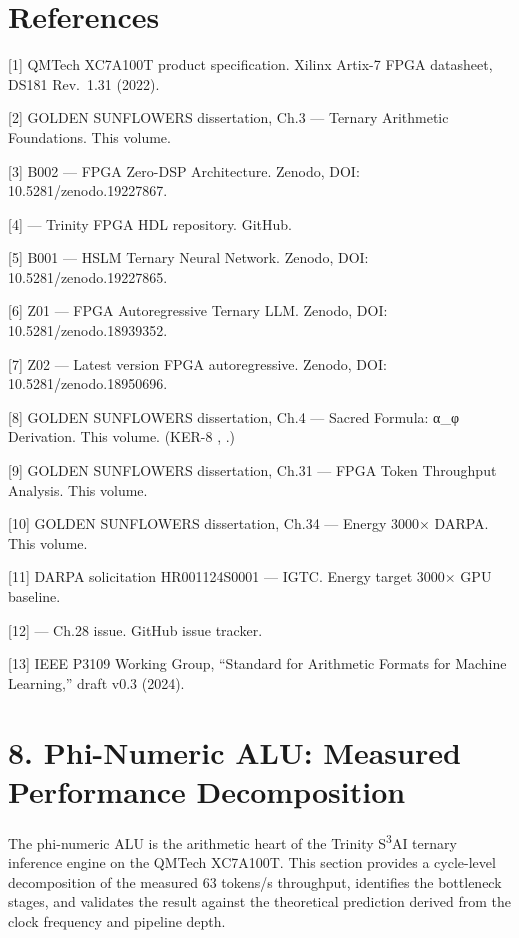 \section{References}\label{fa_28:references}

[1] QMTech XC7A100T product specification.
Xilinx Artix-7 FPGA datasheet, DS181 Rev.~1.31
(2022).

[2] GOLDEN SUNFLOWERS dissertation, Ch.3 ---
Ternary Arithmetic Foundations. This volume.

[3] B002 --- FPGA Zero-DSP Architecture.
Zenodo, DOI: 10.5281/zenodo.19227867.

[4]  --- Trinity
FPGA HDL repository. GitHub.

[5] B001 --- HSLM Ternary Neural Network.
Zenodo, DOI: 10.5281/zenodo.19227865.

[6] Z01 --- FPGA Autoregressive Ternary LLM.
Zenodo, DOI: 10.5281/zenodo.18939352.

[7] Z02 --- Latest version FPGA
autoregressive. Zenodo, DOI:
10.5281/zenodo.18950696.

[8] GOLDEN SUNFLOWERS dissertation, Ch.4 ---
Sacred Formula: α\_φ Derivation. This volume.
(KER-8 ,
.)

[9] GOLDEN SUNFLOWERS dissertation, Ch.31 ---
FPGA Token Throughput Analysis. This volume.

[10] GOLDEN SUNFLOWERS dissertation, Ch.34 ---
Energy 3000$\times$ DARPA. This volume.

[11] DARPA solicitation HR001124S0001 ---
IGTC. Energy target 3000$\times$ GPU baseline.

[12]  --- Ch.28
issue. GitHub issue tracker.

[13] IEEE P3109 Working Group, ``Standard for
Arithmetic Formats for Machine Learning,'' draft
v0.3 (2024).

\section{8. Phi-Numeric ALU: Measured Performance
Decomposition}\label{fa_28:phi-numeric-alu}

The phi-numeric ALU is the arithmetic heart of the Trinity S\textsuperscript{3}AI ternary inference engine on the QMTech XC7A100T. This section provides a cycle-level decomposition of the measured 63 tokens/s throughput, identifies the bottleneck stages, and validates the result against the theoretical prediction derived from the clock frequency and pipeline depth.

